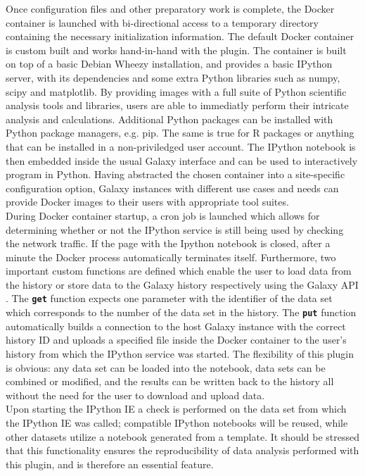 \documentclass{bioinfo}
\begin{document}
\begin{methods}
Once configuration files and other preparatory work is complete, the Docker container is launched with bi-directional
access to a temporary directory containing the necessary initialization information. The default Docker container is
custom built and works hand-in-hand with the plugin. The container is built on top of a basic Debian Wheezy installation,
and provides a basic IPython server, with its dependencies and some extra Python libraries such as numpy, scipy and matplotlib.
By providing images with a full suite of Python scientific analysis tools and libraries, users are able 
to immediatly perform their intricate analysis and calculations. Additional Python packages can be installed with Python
package managers, e.g. pip. The same is true for R packages or anything that can be installed in a non-priviledged user account. 
The IPython notebook is then embedded inside the usual Galaxy interface and can be used to interactively program in Python.
Having abstracted the chosen container into a site-specific configuration option, Galaxy instances with different use cases
and needs can provide Docker images to their users with appropriate tool suites.\\
During Docker container startup, a cron job is launched which allows for determining whether or not the IPython service
is still being used by checking the network traffic. If the page with the Ipython notebook is closed, after a minute the
Docker process automatically terminates itself. Furthermore, two important custom functions are defined which enable the
user to load data from the history or store data to the Galaxy history respectively using the Galaxy API \citep{Sloggett2013}.
The \textbf{\texttt{get}} function expects one parameter with the identifier of the data set which corresponds to the number
of the data set in the history. The \textbf{\texttt{put}} function automatically builds a connection to the host
Galaxy instance with the correct history ID and uploads a specified file inside the Docker container to the user's
history from which the IPython service was started. The flexibility of this plugin is obvious: any data set can be
loaded into the notebook, data sets can be combined or modified, and the results can be written back to the history
all without the need for the user to download and upload data. \\
Upon starting the IPython IE a check is performed on the data set from which the IPython IE was called; compatible IPython
notebooks will be reused, while other datasets utilize a notebook generated from a template. It should be stressed that
this functionality ensures the reproducibility of data analysis performed with this plugin, and is therefore an essential
feature.



\end{methods}
\end{document}
